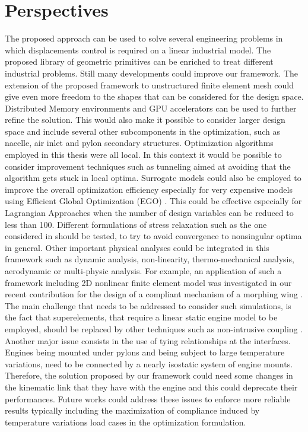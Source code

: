 \section{Perspectives}
The proposed approach can be used to solve several engineering problems in which displacements control is required on a linear industrial model. The proposed library of geometric primitives can be enriched to treat different industrial problems. Still many developments could improve our framework. 
The extension of the proposed framework to unstructured finite element mesh could give even more freedom to the shapes that can be considered for the design space.
Distributed Memory environments and GPU accelerators can be used to further refine the solution. This would also make it possible to consider larger design space and include several other subcomponents in the optimization, such as nacelle, air inlet and pylon secondary structures.
Optimization algorithms employed in this thesis were all local. In this context  it would be possible to consider improvement techniques such as tunneling \cite{zhang2018finding} aimed at avoiding that the algorithm gets stuck in local optima.
Surrogate models could also be employed to improve the overall optimization efficiency especially for very expensive models using Efficient Global Optimization (EGO) \cite{bouhlel2018efficient}. This could be effective especially for Lagrangian Approaches when the number of design variables can be reduced to less than 100.
Different formulations of stress relaxation such as the one considered in \cite{zhang2017stress} should be tested, to try to avoid convergence to nonsingular optima in general.
Other important physical analyses could be integrated in this framework such as dynamic analysis, non-linearity, thermo-mechanical analysis, aerodynamic or multi-physic analysis. For example, an application of such a framework including 2D nonlinear finite element model was investigated in our recent contribution for the design of a compliant mechanism of a morphing wing \cite{capasso2019optimisation}.
The main challenge that needs to be addressed to consider such simulations, is the fact that superelements, that require a linear static engine model to be employed, should be replaced by other techniques such as non-intrusive coupling \cite{Gendre2009}. Another major issue consists in the use of tying relationships at the interfaces. Engines being mounted under pylons and being subject to large temperature variations, need to be connected by a nearly isostatic system of engine mounts. Therefore, the solution proposed by our framework could need some changes in the kinematic link that they have with the engine and this could deprecate their performances. Future works could address these issues to enforce more reliable results typically including the maximization of compliance induced by temperature variations load cases in the optimization formulation. 
